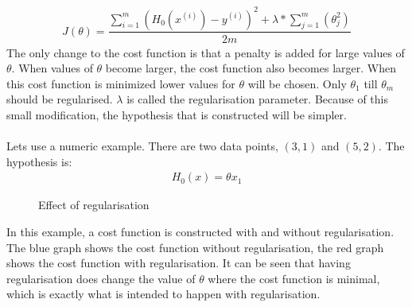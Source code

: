 \begin{align}
J(\theta) = \dfrac{\sum\limits_{i=1}^m(H_0(x^{(i)}) - y^{(i)})^2 + \lambda * \sum\limits_{j=1}^m(\theta_j^2)}{2m}
\end{align}
The only change to the cost function is that a penalty is added for large values of $\theta$. When values of $\theta$ become larger, the cost function also becomes larger. When this cost function is minimized lower values for $\theta$ will be chosen. Only $\theta_1$ till $\theta_m$ should be regularised. $\lambda$ is called the regularisation parameter. Because of this small modification, the hypothesis that is constructed will be simpler.
\\\\
Lets use a numeric example. There are two data points, $(3,1)$ and $(5,2)$. The hypothesis is:
\begin{align}
H_0(x) = \theta x_1
\end{align}
\begin{figure}[H]
\centering
{}
\caption{Effect of regularisation} \label{fig:regularisation}
\end{figure}
\noindent In this example, a cost function is constructed with and without regularisation. The blue graph shows the cost function without regularisation, the red graph shows the cost function with regularisation. It can be seen that having regularisation does change the value of $\theta$ where the cost function is minimal, which is exactly what is intended to happen with regularisation. 

